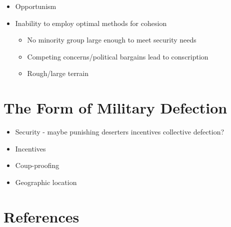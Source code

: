\documentclass[
  12pt,
]{article}
\providecommand{\tightlist}{%
  \setlength{\itemsep}{0pt}\setlength{\parskip}{0pt}}
\begin{document}
\begin{itemize}
\tightlist
\item
  Opportunism
\item
  Inability to employ optimal methods for cohesion

  \begin{itemize}
  \tightlist
  \item
    No minority group large enough to meet security needs
  \item
    Competing concerns/political bargains lead to conscription
  \item
    Rough/large terrain
  \end{itemize}
\end{itemize}

\hypertarget{the-form-of-military-defection}{%
\section{The Form of Military Defection}\label{the-form-of-military-defection}}

\begin{itemize}
\tightlist
\item
  Security - maybe punishing deserters incentives collective defection?
\item
  Incentives
\item
  Coup-proofing
\item
  Geographic location
\end{itemize}

\hypertarget{references}{%
\section*{References}\label{references}}


\indent

\setlength{\parindent}{-0.2in}
\setlength{\leftskip}{0.2in}
\setlength{\parskip}{8pt}

\singlespacing
\end{document}
